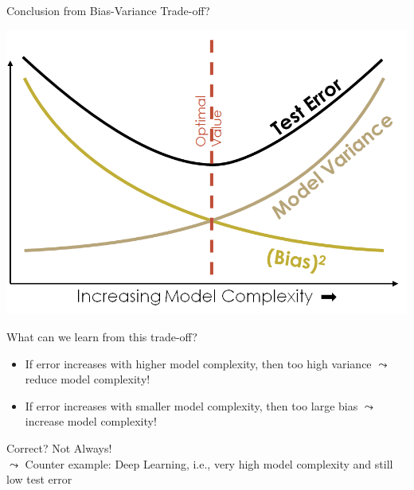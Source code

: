 \documentclass[aspectratio=169]{../latex_main/tntbeamer}  %
\begin{document}
	\begin{frame}{Conclusion from Bias-Variance Trade-off?}
	\vspace{-2em}
	   \begin{center}
	        \includegraphics[scale=.2]{Bild14}   
	   \end{center}
	    
	 What can we learn from this trade-off?
	 
	 \begin{itemize}
	     \item If error increases with higher model complexity, then too high variance $\leadsto$ reduce model complexity!
	     \item If error increases with smaller model complexity, then too large bias $\leadsto$ increase model complexity!
	 \end{itemize}
	 
	 Correct? Not Always!\\
	 $\leadsto$ Counter example: Deep Learning, i.e., very high model complexity and still low test error
	    
	\end{frame}
	
\end{document}
